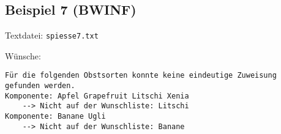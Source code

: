 \subsection{Beispiel 7 (BWINF)}\label{example:7}
Textdatei: \texttt{spiesse7.txt}\vspace{0.25cm}

\noindent
Wünsche: 
\vspace{0.25cm}

\noindent
{}
\begin{verbatim}
Für die folgenden Obstsorten konnte keine eindeutige Zuweisung gefunden werden.
Komponente: Apfel Grapefruit Litschi Xenia 
	--> Nicht auf der Wunschliste: Litschi 
Komponente: Banane Ugli 
	--> Nicht auf der Wunschliste: Banane 
\end{verbatim}

